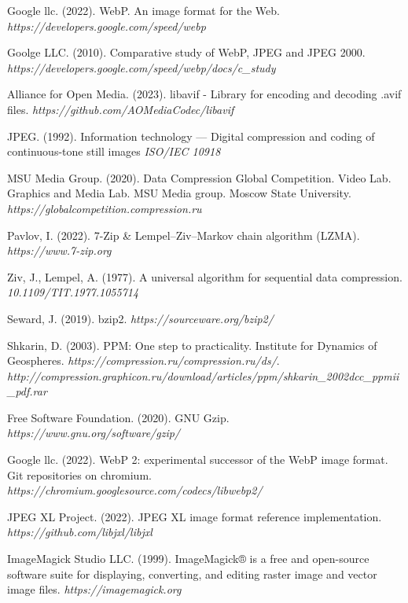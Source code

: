 \documentclass[11pt,a4paper]{report}
\begin{document}
\begin{thebibliography}{9}
Google llc. (2022). WebP. An image format for the Web. \textit{https://developers.google.com/speed/webp}

Goolge LLC. (2010). Comparative study of WebP, JPEG and JPEG 2000.
\textit{https://developers.google.com/speed/webp/docs/c\_study}

Alliance for Open Media. (2023). libavif - Library for encoding and decoding .avif files. \textit{https://github.com/AOMediaCodec/libavif}

JPEG. (1992). Information technology — Digital compression and coding of continuous-tone still images \textit{ISO/IEC 10918}

MSU Media Group. (2020). Data Compression Global Competition. Video Lab. Graphics and Media Lab. MSU Media group. Moscow State University. \textit{https://globalcompetition.compression.ru}

Pavlov, I. (2022). 7-Zip \& Lempel–Ziv–Markov chain algorithm (LZMA). \textit{https://www.7-zip.org}

Ziv, J., Lempel, A. (1977). A universal algorithm for sequential data compression. \textit{10.1109/TIT.1977.1055714}

Seward, J. (2019). bzip2. \textit{https://sourceware.org/bzip2/}

Shkarin, D. (2003). PPM: One step to practicality. Institute for Dynamics of Geospheres. \textit{https://compression.ru/compression.ru/ds/}. \textit{http://compression.graphicon.ru/download/articles/ppm/shkarin\_2002dcc\_ppmii\_pdf.rar}

Free Software Foundation. (2020). GNU Gzip. \textit{https://www.gnu.org/software/gzip/}

Google llc. (2022). WebP 2: experimental successor of the WebP image format. Git repositories on chromium. \textit{https://chromium.googlesource.com/codecs/libwebp2/}

JPEG XL Project. (2022). JPEG XL image format reference implementation. \textit{https://github.com/libjxl/libjxl}

ImageMagick Studio LLC. (1999). ImageMagick® is a free and open-source software suite for displaying, converting, and editing raster image and vector image files. \textit{https://imagemagick.org}


\end{thebibliography}
\end{document}
